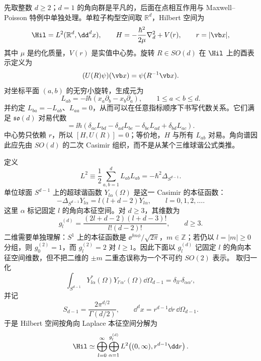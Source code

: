 先取整数 $d\ge2$；$d=1$ 的角向群是平凡的，后面在点相互作用与 Maxwell--Poisson 特例中单独处理。单粒子构型空间取 $\mathbb R^d$，Hilbert 空间为
\begin{equation}
\Hil=L^2(\mathbb R^d,\dd^d x),\qquad
H=-\frac{\hbar^2}{2\mu}\nabla_d^2+V(r),\qquad r=|\vb x|,
\label{eq:phys-hdqm-hilbert-hamiltonian}
\end{equation}
其中 $\mu$ 是约化质量，$V(r)$ 是实值中心势。旋转 $R\in SO(d)$ 在 $\Hil$ 上的酉表示定义为
\[
(U(R)\psi)(\vb x)=\psi(R^{-1}\vb x).
\]
对坐标平面 $(a,b)$ 的无穷小旋转，生成元为
\begin{equation}
L_{ab}=-\ii\hbar\left(x_a\partial_b-x_b\partial_a\right),
\qquad 1\le a<b\le d.
\label{eq:phys-hdqm-so-d-generators}
\end{equation}
并约定 $L_{ba}=-L_{ab}$、$L_{aa}=0$，从而可以在任意指标顺序下书写代数关系。它们满足 $\mathfrak{so}(d)$ 对易代数
\begin{equation}
[L_{ab},L_{cd}]
=\ii\hbar\left(
\delta_{ac}L_{bd}-\delta_{ad}L_{bc}
-\delta_{bc}L_{ad}+\delta_{bd}L_{ac}
\right).
\label{eq:phys-hdqm-so-d-algebra}
\end{equation}
中心势只依赖 $r$，所以 $[H,U(R)]=0$；等价地，$H$ 与所有 $L_{ab}$ 对易。角向谱因此应先由 $SO(d)$ 的二次 Casimir 组织，而不是从某个三维球谐公式类推。

定义
\begin{equation}
L^2\equiv\frac12\sum_{a,b=1}^dL_{ab}L_{ab}
=-\hbar^2\Delta_{S^{d-1}}.
\label{eq:phys-hdqm-casimir-sphere}
\end{equation}
单位球面 $S^{d-1}$ 上的超球谐函数 $Y_{l\alpha}(\Omega)$ 是这一 Casimir 的本征函数：
\begin{equation}
-\Delta_{S^{d-1}}Y_{l\alpha}
=l(l+d-2)Y_{l\alpha},
\qquad l=0,1,2,\ldots.
\label{eq:phys-hdqm-hyperspherical-spectrum}
\end{equation}
这里 $\alpha$ 标记固定 $l$ 的角向本征空间。对 $d\ge3$，其维数为
\begin{equation}
g_l^{(d)}=
\frac{(2l+d-2)(l+d-3)!}{l!(d-2)!},
\qquad d\ge3.
\label{eq:phys-hdqm-degeneracy}
\end{equation}
二维需要单独理解：$S^1$ 上的本征函数是 $\ee^{\ii m\phi}/\sqrt{2\pi}$，$m\in\mathbb Z$；若仍以 $l=|m|\ge0$ 分组，则 $g_0^{(2)}=1$，而 $g_l^{(2)}=2$ 对 $l\ge1$。因此下面以 $g_l^{(d)}$ 记固定 $l$ 的角向本征空间维数，但不把二维的 $\pm m$ 二重态误称为一个不可约 $SO(2)$ 表示。
取归一化
\[
\int_{S^{d-1}}Y_{l\alpha}^*(\Omega)Y_{l'\alpha'}(\Omega)\dd\Omega_{d-1}
=\delta_{ll'}\delta_{\alpha\alpha'},
\]
并记
\begin{equation}
S_{d-1}=\frac{2\pi^{d/2}}{\Gamma(d/2)},\qquad
\dd^d x=r^{d-1}\dd r\,\dd\Omega_{d-1}.
\label{eq:phys-hdqm-d-volume}
\end{equation}
于是 Hilbert 空间按角向 Laplace 本征空间分解为
\begin{equation}
\Hil\simeq
\bigoplus_{l=0}^{\infty}
\bigoplus_{\alpha=1}^{g_l^{(d)}}
L^2\!\left((0,\infty),r^{d-1}\dd r\right).
\label{eq:phys-hdqm-partial-wave-hilbert}
\end{equation}

